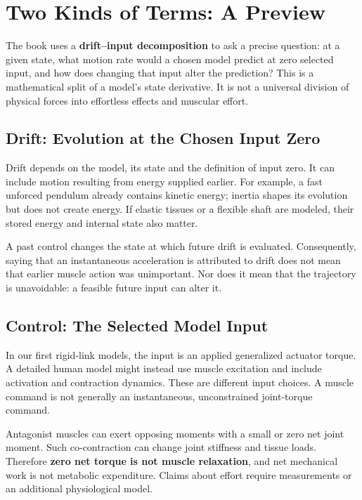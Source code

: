 \section{Two Kinds of Terms: A Preview}\label{ch01:two-kinds-of-forces-a-preview}

The book uses a \textbf{drift--input decomposition} to ask a precise question: at a given state, what motion rate would a chosen model predict at zero selected input, and how does changing that input alter the prediction? This is a mathematical split of a model's state derivative. It is not a universal division of physical forces into effortless effects and muscular effort.

\subsection{Drift: Evolution at the Chosen Input Zero}\label{ch01:drift-the-physics-you-cant-control}

Drift depends on the model, its state and the definition of input zero. It can include motion resulting from energy supplied earlier. For example, a fast unforced pendulum already contains kinetic energy; inertia shapes its evolution but does not create energy. If elastic tissues or a flexible shaft are modeled, their stored energy and internal state also matter.

A past control changes the state at which future drift is evaluated. Consequently, saying that an instantaneous acceleration is attributed to drift does not mean that earlier muscle action was unimportant. Nor does it mean that the trajectory is unavoidable: a feasible future input can alter it.

\subsection{Control: The Selected Model Input}\label{ch01:control-what-your-muscles-add}

In our first rigid-link models, the input is an applied generalized actuator torque. A detailed human model might instead use muscle excitation and include activation and contraction dynamics. These are different input choices. A muscle command is not generally an instantaneous, unconstrained joint-torque command.

Antagonist muscles can exert opposing moments with a small or zero net joint moment. Such co-contraction can change joint stiffness and tissue loads. Therefore \textbf{zero net torque is not muscle relaxation}, and net mechanical work is not metabolic expenditure. Claims about effort require measurements or an additional physiological model.

